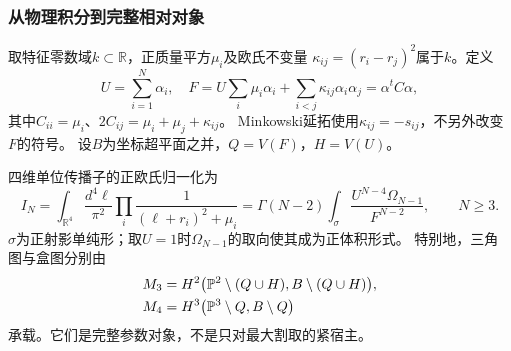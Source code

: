 \documentclass[11pt,a4paper,oneside]{ctexart}
\theoremstyle{cnplain}
\theoremstyle{definition}
\theoremstyle{remark}
\numberwithin{equation}{section}
\begin{document}
\subsubsection{从物理积分到完整相对对象}
取特征零数域$k\subset\mathbb R$，正质量平方$\mu_i$及欧氏不变量
$\kappa_{ij}=(r_i-r_j)^2$属于$k$。定义
\[
 U=\sum_{i=1}^N\alpha_i,\quad
 F=U\sum_i\mu_i\alpha_i+\sum_{i<j}\kappa_{ij}\alpha_i\alpha_j
   =\alpha^t C\alpha,
\]
其中$C_{ii}=\mu_i$、$2C_{ij}=\mu_i+\mu_j+\kappa_{ij}$。
Minkowski延拓使用$\kappa_{ij}=-s_{ij}$，不另外改变$F$的符号。
设$B$为坐标超平面之并，$Q=V(F)$，$H=V(U)$。

四维单位传播子的正欧氏归一化为
\begin{equation}\label{unified:eq:onephysical}
 I_N=\int_{\mathbb R^4}\frac{d^4\ell}{\pi^2}
           \prod_i\frac1{(\ell+r_i)^2+\mu_i}
     =\Gamma(N-2)\int_{\sigma}
        \frac{U^{N-4}\Omega_{N-1}}{F^{N-2}},\qquad N\ge3.
\end{equation}
$\sigma$为正射影单纯形；取$U=1$时$\Omega_{N-1}$的取向使其成为正体积形式。
特别地，三角图与盒图分别由
\begin{align}\label{unified:eq:onepairs}
 M_3&=H^2\bigl(\mathbb P^2\setminus(Q\cup H),
             B\setminus(Q\cup H)\bigr),\notag\\
 M_4&=H^3\bigl(\mathbb P^3\setminus Q,B\setminus Q\bigr)
\end{align}
承载。它们是完整参数对象，不是只对最大割取的紧宿主。
\end{document}
